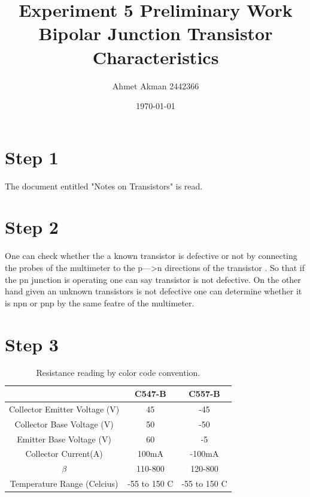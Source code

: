 \documentclass[letterpaper,12pt]{article}
\begin{document}
\title{Experiment 5 Preliminary Work \protect\\ Bipolar Junction Transistor Characteristics}
\author{Ahmet Akman 2442366 \protect\\}
\date{\today}
\maketitle
\tableofcontents

\section{Step 1}
The document entitled "Notes on Transistors" is read.
\section{Step 2}
One can check whether the a known transistor is defective or not by connecting the probes of the multimeter to the p--->n directions of the transistor . So that if the pn junction is operating one can say transistor is not defective. On the other hand given an unknown transistors is not defective one can determine whether it is npn or pnp by the same featre of the multimeter.
\section{Step 3}
\begin{table}[H]
    \begin{center}
        \caption{Resistance reading by color code convention.}
        \vspace{2mm}
        \begin{tabular}{||c | c | c||} 
            \hline
             & C547-B & C557-B \\ [0.5ex] 
            \hline\hline
            Collector Emitter Voltage (V) & 45 &-45  \\ 
            \hline
            Collector Base Voltage (V)   & 50 & -50   \\
            \hline
            Emitter Base Voltage (V) & 60 & -5  \\  
            \hline
            
            Collector Current(A) & 100mA & -100mA\\ 
            \hline
            
            \(\beta\) & 110-800 & 120-800  \\ 
             
            \hline
            Temperature Range (Celcius) & -55 to 150 C & -55 to 150 C \\ [1ex] 
            \hline
        \end{tabular}
    \end{center}
    \end{table}
\end{document}
